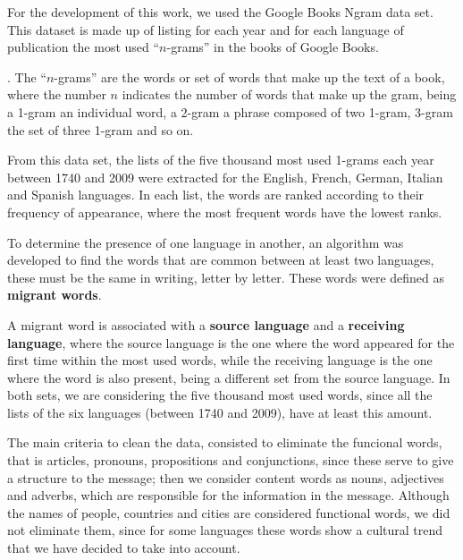 \documentclass[10pt,letterpaper]{article} %
\begin{document}
For the development of this work,  we used the Google Books Ngram data set.
This dataset is made up of listing for each year and for each language of
publication the most used ``$n$-grams'' in the books of Google Books. 

 . The ``$n$-grams'' are the words or set of
words that make up the text of a book, where the number $n$ indicates the number of words that make up the gram, being a 1-gram an individual word, a 2-gram a phrase composed of two 1-gram, 3-gram the set of three 1-gram and so on.

From this data set, the lists of the five thousand most used 1-grams each year
between 1740 and 2009 were extracted for the English, French, German, Italian
and Spanish languages. In each list, the words are ranked according to their
frequency of appearance, where the most frequent words have the lowest ranks.


To determine the presence of one language in another, an algorithm was
developed to find the words that are common between at least two languages,
these must be the same in writing, letter by letter. These words were defined as \textbf{migrant words}. 

A migrant word is associated with a \textbf{source language} and a
\textbf{receiving language}, where the source language is the one where the
word appeared for the first time within the most used words,
while the receiving language is the one where the word is also present, being a
different set from the source language. In both sets, we are considering the five thousand most used words, since all the lists of the six languages (between 1740 and 2009), have at least this amount.  

The main criteria to clean the data, consisted to eliminate the funcional words, that is articles, pronouns, propositions and conjunctions, since these serve to give a structure to the message;  then we consider content words as nouns, adjectives and adverbs, which are responsible for the information in the message. Although the names of people, countries and cities are considered functional words, we did not eliminate them, since for some languages these words show a cultural trend that we have decided to take into account.
\end{document}
